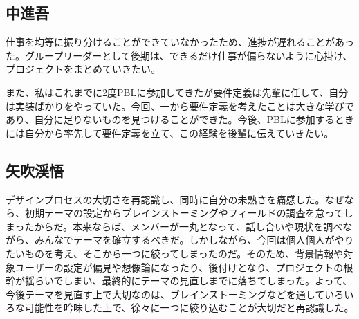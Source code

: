 \documentclass[openany,11pt,papersize]{jsbook}
\begin{document}
\subsection{中進吾}
\par 仕事を均等に振り分けることができていなかったため、進捗が遅れることがあった。グループリーダーとして後期は、できるだけ仕事が偏らないように心掛け、プロジェクトをまとめていきたい。
\par また、私はこれまでに2度PBLに参加してきたが要件定義は先輩に任して、自分は実装ばかりをやっていた。今回、一から要件定義を考えたことは大きな学びであり、自分に足りないものを見つけることができた。今後、PBLに参加するときには自分から率先して要件定義を立て、この経験を後輩に伝えていきたい。

\subsection{矢吹渓悟}
デザインプロセスの大切さを再認識し、同時に自分の未熟さを痛感した。なぜなら、初期テーマの設定からブレインストーミングやフィールドの調査を怠ってしまったからだ。本来ならば、メンバーが一丸となって、話し合いや現状を調べながら、みんなでテーマを確立するべきだ。しかしながら、今回は個人個人がやりたいものを考え、そこから一つに絞ってしまったのだ。そのため、背景情報や対象ユーザーの設定が偏見や想像論になったり、後付けとなり、プロジェクトの根幹が揺らいでしまい、最終的にテーマの見直しまでに落ちてしまった。よって、今後テーマを見直す上で大切なのは、ブレインストーミングなどを通していろいろな可能性を吟味した上で、徐々に一つに絞り込むことが大切だと再認識した。
\end{document}
